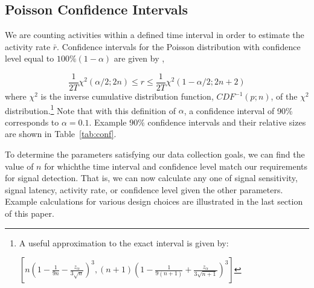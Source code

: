 \documentclass{article}
\begin{document}
\subsection{Poisson Confidence Intervals} 
\label{conf}

We 
\reversemarginpar\marginpar{\raggedleft
%
    \begin{tikzpicture}[scale=0.26]]
\draw [red, very thick, rotate around={0: (0, 0)}] (-0.7, -0.7) rectangle(3.7, 0.7);
%
\draw [very thick, <->] (0.25000000000000006, 0.4330127018922193) -- (1.25, 2.165063509461097) ;
\draw [very thick, <->] (1.75, 2.165063509461097) -- (2.75, 0.4330127018922193) ;
\draw [very thick, <->] (2.5, 0) -- (0.5, 0) ;
%
\draw [orange, ultra thick] (0,0) circle [radius= 0.5 ];
\draw [yellow, ultra thick] ( 1.5 , 2.59807621135 ) circle [radius= 0.5 ];
\draw [green,  ultra thick] ( 3.0 , 0 ) circle [radius= 0.5 ];
    \end{tikzpicture}
%
%
}
are counting activities within a defined time interval in order to estimate the activity rate $\bar{r}$. 
Confidence intervals for the Poisson distribution with confidence level equal to $100\%(1-\alpha)$ 
are given by \cite{George:2012},

\begin{equation}
    \label{eq:chisqconf}
    \frac{1}{2T} \chi^2(\alpha/2;2n) \leq r \leq \frac{1}{2T} \chi^2(1-\alpha/2;2n+2)
\end{equation}
where $\chi^2$ is the inverse cumulative distribution function, $CDF^{-1}(p; n)$, of the $\chi^2$ 
distribution.\footnote{A useful approximation to the exact interval is given by:

$[ n(1 - \frac{1}{9n} - \frac{z_{\alpha}}{3\sqrt{n}})^3 , 
(n+1)(1- \frac{1}{9(n+1)} + \frac{z_{\alpha}}{3\sqrt{n+1}})^3]$ }
Note that with this definition of $\alpha$, a confidence interval of 90\% corresponds to 
$\alpha=0.1$. Example $90\%$ confidence intervals and their relative sizes are shown in 
Table~\ref{tab:conf}.

To determine the parameters satisfying our data collection goals, we can find the value of $n$ for 
whichthe time interval and confidence level match our requirements for signal detection.  
That is, we can now calculate any one of signal sensitivity, signal latency, activity rate, or confidence 
level given the other parameters. Example calculations for various design choices are illustrated in the 
last section of this paper.
\end{document}
